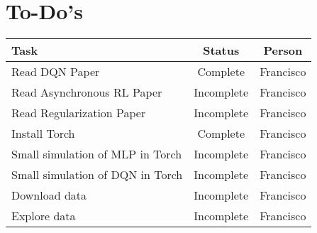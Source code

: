 \documentclass[12pt]{article}
\begin{document}
\section{To-Do's}
\center
\begin{tabular}{ l | c | c  }
	\hline
	Task  & Status  & Person\\ \hline
  	Read DQN Paper \cite{MnihKSGAWR13}  & Complete  & Francisco \\
	Read Asynchronous RL Paper \cite{DBLP:journals/corr/MnihBMGLHSK16} & Incomplete  & Francisco \\
	Read  Regularization Paper \cite{chen2012marginalized} & Incomplete  & Francisco \\
	Install Torch & Complete  & Francisco \\
	Small simulation of MLP in Torch & Incomplete  & Francisco \\
	Small simulation of DQN in Torch & Incomplete  & Francisco \\
	Download data & Incomplete  & Francisco \\
	Explore data & Incomplete  & Francisco \\
	\hline
\end{tabular}


\end{document}
